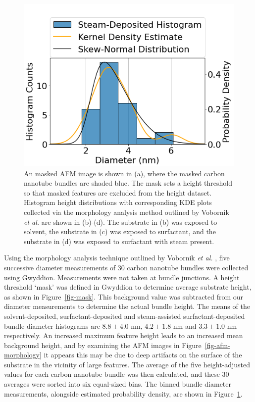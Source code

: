 \documentclass[
  a4paper,
]{scrbook}
\begin{document}
\begin{figure}
\begin{minipage}[t]{0.47\linewidth}
{{\includegraphics{figures/ch6/NT14D2_W4_pristine_cnt_histogram.png}

}

}

\subcaption{\label{fig-steamed-surfactant-cnt-histogram}}
\end{minipage}%

\caption{\label{fig-cnt-histogram}An masked AFM image is shown in (a),
where the masked carbon nanotube bundles are shaded blue. The mask sets
a height threshold so that masked features are excluded from the height
dataset. Histogram height distributions with corresponding KDE plots
collected via the morphology analysis method outlined by Vobornik
\emph{et al.} \autocite{Vobornik2023} are shown in (b)-(d). The
substrate in (b) was exposed to solvent, the substrate in (c) was
exposed to surfactant, and the substrate in (d) was exposed to
surfactant with steam present.}

\end{figure}

Using the morphology analysis technique outlined by Vobornik \emph{et
al.} \autocite{Vobornik2023}, five successive diameter measurements of
30 carbon nanotube bundles were collected using Gwyddion. Measurements
were not taken at bundle junctions. A height threshold `mask' was
defined in Gwyddion to determine average substrate height, as shown in
Figure~\ref{fig-mask}. This background value was subtracted from our
diameter measurements to determine the actual bundle height. The means
of the solvent-deposited, surfactant-deposited and steam-assisted
surfactant-deposited bundle diameter histograms are \(8.8 \pm 4.0\) nm,
\(4.2 \pm 1.8\) nm and \(3.3 \pm 1.0\) nm respectively. An increased
maximum feature height leads to an increased mean background height, and
by examining the AFM images in Figure~\ref{fig-afm-morphology} it
appears this may be due to deep artifacts on the surface of the
substrate in the vicinity of large features. The average of the five
height-adjusted values for each carbon nanotube bundle was then
calculated, and these 30 averages were sorted into six equal-sized bins.
The binned bundle diameter measurements, alongside estimated probability
density, are shown in Figure~\ref{fig-cnt-histogram}.
\end{document}

